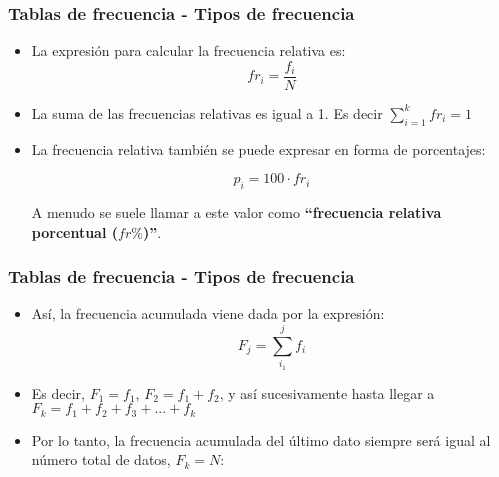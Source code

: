 \documentclass[10pt]{beamer}
\theoremstyle{plain} %
\theoremstyle{definition}
\newtheorem{defn}{Definición}
\theoremstyle{remark}
\begin{document}
\begin{frame}
\frametitle{Tablas de frecuencia - Tipos de frecuencia}
\begin{itemize}[<+->]
\justifying
\begin{defn}[Frecuencia relativa]
La frecuencia relativa es el cociente entre la frecuencia absoluta de un determinado valor y el número total de datos. Se representa por $fr_i$ , aunque algunos autores la representan con $h_i$ o $n_i$.
\end{defn}
\item La expresión para calcular la frecuencia relativa es: $$fr_i=\frac{f_i}{N}$$
\item La suma de las frecuencias relativas es igual a 1. Es decir $\sum_{i=1}^{k} fr_i=1$

\item La frecuencia relativa también se puede expresar en forma de porcentajes:

$$p_i=100\cdot fr_i$$

A menudo se suele llamar a este valor como \textbf{``frecuencia relativa porcentual ($fr\%$)''}.
\end{itemize} 
\end{frame}

\begin{frame}
\frametitle{Tablas de frecuencia - Tipos de frecuencia}
\begin{itemize}[<+->]
\justifying
\begin{defn}[Frecuencia acumulada]
La frecuencia acumulada es la suma de las frecuencias absolutas de todos los valores inferiores o iguales al valor considerado. Se representa por $F_i$.
\end{defn}
\item Así, la frecuencia acumulada viene dada por la expresión:
$$F_j=\sum_{i_1}^{j}f_i$$

\item Es decir, $F_1=f_1$, $F_2=f_1+f_2$, y así sucesivamente hasta llegar a $F_k=f_1+f_2+f_3+...+f_k$

\item Por lo tanto, la frecuencia acumulada del último dato siempre será igual al número total de datos, $F_k=N$:

\end{itemize} 
\end{frame}
\end{document}
